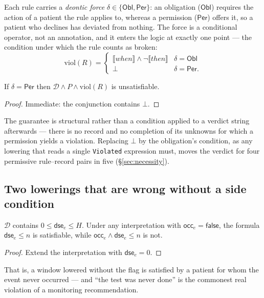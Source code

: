 Each rule carries a \emph{deontic force} $\delta \in \{\mathsf{Obl},
\mathsf{Per}\}$: an obligation ($\mathsf{Obl}$) requires the action of a patient the rule applies to, whereas a permission ($\mathsf{Per}$) offers it, so a patient who declines has deviated from nothing. The force is a conditional operator, not an annotation, and it enters the logic at exactly one point --- the condition under which the rule counts as broken:
\[
  \mathrm{viol}(R) =
  \begin{cases}
    \llbracket \mathit{when} \rrbracket \wedge
      \neg\llbracket \mathit{then} \rrbracket & \delta = \mathsf{Obl} \\
    \bot & \delta = \mathsf{Per.}
  \end{cases}
\]

\begin{proposition}
\label{prop:permission}
If $\delta = \mathsf{Per}$ then $\mathcal{D}\wedge P\wedge\mathrm{viol}(R)$ is
unsatisfiable.
\end{proposition}
\begin{proof}
Immediate: the conjunction contains $\bot$.
\end{proof}

The guarantee is structural rather than a condition applied to a verdict string
afterwards --- there is no record and no completion of its unknowns for which a
permission yields a violation. Replacing $\bot$ by the obligation's condition,
as any lowering that reads a single \texttt{Violated} expression must, moves the
verdict for four permissive rule--record pairs in five (\S\ref{sec:necessity}).

\subsection{Two lowerings that are wrong without a side condition}

\begin{proposition}
\label{prop:occ}
$\mathcal{D}$ contains $0 \le \mathsf{dse}_e \le H$. Under any interpretation
with $\mathsf{occ}_e = \textsf{false}$, the formula $\mathsf{dse}_e \le n$ is
satisfiable, while $\mathsf{occ}_e \wedge \mathsf{dse}_e \le n$ is not.
\end{proposition}
\begin{proof}
Extend the interpretation with $\mathsf{dse}_e = 0$.
\end{proof}

That is, a window lowered without the flag is satisfied by a patient for whom
the event never occurred --- and ``the test was never done'' is the commonest
real violation of a monitoring recommendation.\\

